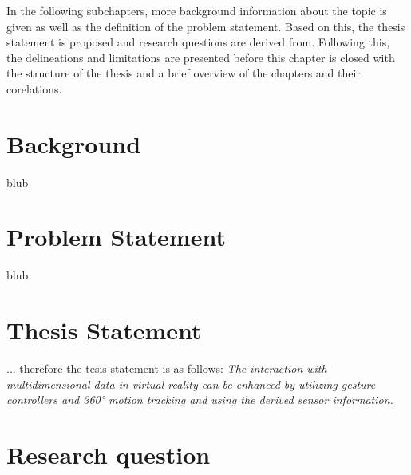 In the following subchapters, more background information about the topic is given as well as the definition of the problem statement. Based on this, the thesis statement is proposed and research questions are derived from. Following this, the delineations and limitations are presented before this chapter is closed with the structure of the thesis and a brief overview of the chapters and their corelations.



\section{Background}

blub



\section{Problem Statement}

blub



\section{Thesis Statement}
... therefore the tesis statement is as follows: \newline
\textit{The interaction with multidimensional data in virtual reality can be enhanced by utilizing gesture controllers and 360° motion tracking and using the derived sensor information.}


\section{Research question}

